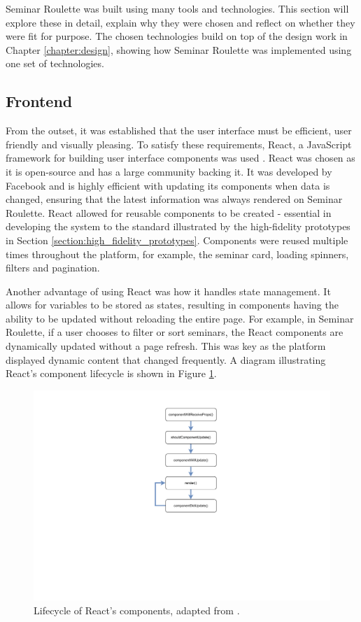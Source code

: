 \documentclass{l4proj}
\begin{document}
Seminar Roulette was built using many tools and technologies. This section will explore these in detail, explain why they were chosen and reflect on whether they were fit for purpose. The chosen technologies build on top of the design work in Chapter \ref{chapter:design}, showing how Seminar Roulette was implemented using one set of technologies.

\subsection{Frontend}

From the outset, it was established that the user interface must be efficient, user friendly and visually pleasing. To satisfy these requirements, React, a JavaScript framework for building user interface components was used \citep{react}. React was chosen as it is open-source and has a large community backing it. It was developed by Facebook and is highly efficient with updating its components when data is changed, ensuring that the latest information was always rendered on Seminar Roulette. React allowed for reusable components to be created - essential in developing the system to the standard illustrated by the high-fidelity prototypes in Section \ref{section:high_fidelity_prototypes}. Components were reused multiple times throughout the platform, for example, the seminar card, loading spinners, filters and pagination.

Another advantage of using React was how it handles state management. It allows for variables to be stored as states, resulting in components having the ability to be updated without reloading the entire page. For example, in Seminar Roulette, if a user chooses to filter or sort seminars, the React components are dynamically updated without a page refresh. This was key as the platform displayed dynamic content that changed frequently. A diagram illustrating React's component lifecycle is shown in Figure \ref{fig:react_life_cycle}.

\begin{figure}[htb]
    \centering
    \includegraphics[width=0.35\linewidth]{images/react_life_cycle.pdf}    
    \caption{Lifecycle of React's components, adapted from \cite{reactlifecycle}.}
    \label{fig:react_life_cycle} 
\end{figure}
\end{document}
